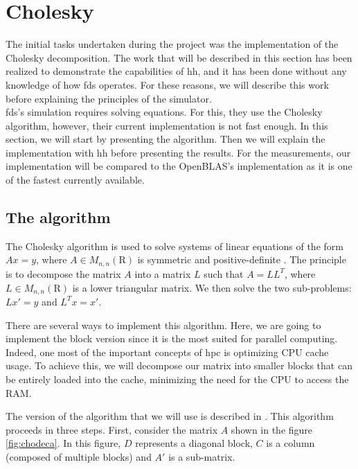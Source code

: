
\clearpage{}
\section{Cholesky}

The initial tasks undertaken during the project was the implementation of the
Cholesky decomposition. The work that will be described in this section has been
realized to demonstrate the capabilities of \gls{hh}, and it has been done
without any knowledge of how \gls{fds} operates. For these reasons, we will
describe this work before explaining the principles of the simulator.\\

\gls{fds}'s simulation requires solving equations. For this, they use the
Cholesky algorithm, however, their current implementation is not fast enough. In
this section, we will start by presenting the algorithm. Then we will explain
the implementation with \gls{hh} before presenting the results. For the
measurements, our implementation will be compared to the OpenBLAS's
implementation as it is one of the fastest currently available.

\subsection{The algorithm}
\label{sec:choalgo}

The Cholesky algorithm is used to solve systems of linear equations of the form
$Ax = y$, where $A \in M_{n,n}(\mathrm{R})$ is symmetric and positive-definite
\cite{choleskywiki}. The principle is to decompose the matrix $A$ into a matrix
$L$ such that $A = LL^{T}$, where $L \in M_{n,n}(\mathrm{R})$ is a lower
triangular matrix. We then solve the two sub-problems: $Lx' = y$ and $L^{T}x =
x'$.

There are several ways to implement this algorithm. Here, we are going to
implement the block version since it is the most suited for parallel computing.
Indeed, one most of the important concepts of \gls{hpc} is optimizing CPU cache
usage. To achieve this, we will decompose our matrix into smaller blocks that
can be entirely loaded into the cache, minimizing the need for the CPU to access
the RAM.

The version of the algorithm that we will use is described in
\cite{choleskyblock}. This algorithm proceeds in three steps. First, consider
the matrix $A$ shown in the figure \ref{fig:chodeca}. In this figure, $D$
represents a diagonal block, $C$ is a column (composed of multiple blocks) and
$A'$ is a sub-matrix.

